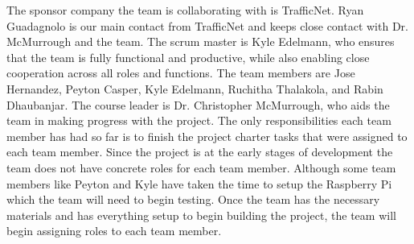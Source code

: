 The sponsor company the team is collaborating with is TrafficNet. Ryan Guadagnolo is our main contact from TrafficNet and keeps close contact with Dr. McMurrough and the team. The scrum master is Kyle Edelmann, who ensures that the team is fully functional and productive, while also enabling close cooperation across all roles and functions. The team members are Jose Hernandez, Peyton Casper, Kyle Edelmann, Ruchitha Thalakola, and Rabin Dhaubanjar. The course leader is Dr. Christopher McMurrough, who aids the team in making progress with the project. The only responsibilities each team member has had so far is to finish the project charter tasks that were assigned to each team member. Since the project is at the early stages of development the team does not have concrete roles for each team member. Although some team members like Peyton and Kyle have taken the time to setup the Raspberry Pi which the team will need to begin testing. Once the team has the necessary materials and has everything setup to begin building the project, the team will begin assigning roles to each team member.
